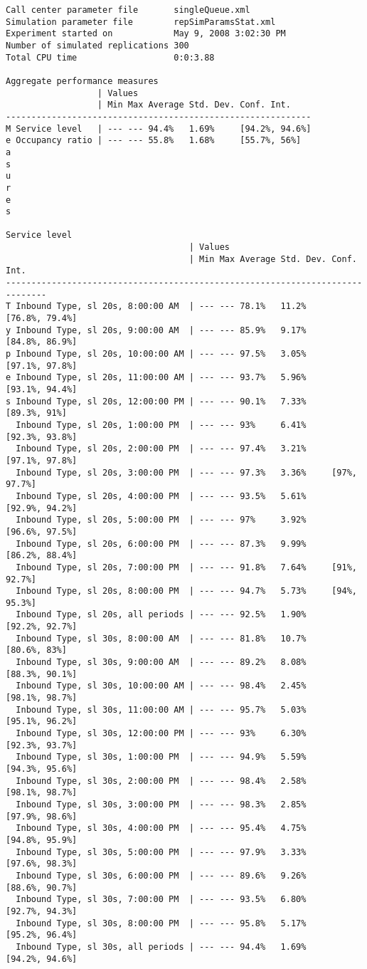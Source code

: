 \begin{lstlisting}[language={}, caption={Sample output of the
    simulator}, label=lst:exout]
Call center parameter file       singleQueue.xml
Simulation parameter file        repSimParamsStat.xml
Experiment started on            May 9, 2008 3:02:30 PM
Number of simulated replications 300
Total CPU time                   0:0:3.88

Aggregate performance measures
                  | Values
                  | Min Max Average Std. Dev. Conf. Int.
------------------------------------------------------------
M Service level   | --- --- 94.4%   1.69%     [94.2%, 94.6%]
e Occupancy ratio | --- --- 55.8%   1.68%     [55.7%, 56%]
a
s
u
r
e
s

Service level
                                    | Values
                                    | Min Max Average Std. Dev. Conf. Int.
------------------------------------------------------------------------------
T Inbound Type, sl 20s, 8:00:00 AM  | --- --- 78.1%   11.2%     [76.8%, 79.4%]
y Inbound Type, sl 20s, 9:00:00 AM  | --- --- 85.9%   9.17%     [84.8%, 86.9%]
p Inbound Type, sl 20s, 10:00:00 AM | --- --- 97.5%   3.05%     [97.1%, 97.8%]
e Inbound Type, sl 20s, 11:00:00 AM | --- --- 93.7%   5.96%     [93.1%, 94.4%]
s Inbound Type, sl 20s, 12:00:00 PM | --- --- 90.1%   7.33%     [89.3%, 91%]
  Inbound Type, sl 20s, 1:00:00 PM  | --- --- 93%     6.41%     [92.3%, 93.8%]
  Inbound Type, sl 20s, 2:00:00 PM  | --- --- 97.4%   3.21%     [97.1%, 97.8%]
  Inbound Type, sl 20s, 3:00:00 PM  | --- --- 97.3%   3.36%     [97%, 97.7%]
  Inbound Type, sl 20s, 4:00:00 PM  | --- --- 93.5%   5.61%     [92.9%, 94.2%]
  Inbound Type, sl 20s, 5:00:00 PM  | --- --- 97%     3.92%     [96.6%, 97.5%]
  Inbound Type, sl 20s, 6:00:00 PM  | --- --- 87.3%   9.99%     [86.2%, 88.4%]
  Inbound Type, sl 20s, 7:00:00 PM  | --- --- 91.8%   7.64%     [91%, 92.7%]
  Inbound Type, sl 20s, 8:00:00 PM  | --- --- 94.7%   5.73%     [94%, 95.3%]
  Inbound Type, sl 20s, all periods | --- --- 92.5%   1.90%     [92.2%, 92.7%]
  Inbound Type, sl 30s, 8:00:00 AM  | --- --- 81.8%   10.7%     [80.6%, 83%]
  Inbound Type, sl 30s, 9:00:00 AM  | --- --- 89.2%   8.08%     [88.3%, 90.1%]
  Inbound Type, sl 30s, 10:00:00 AM | --- --- 98.4%   2.45%     [98.1%, 98.7%]
  Inbound Type, sl 30s, 11:00:00 AM | --- --- 95.7%   5.03%     [95.1%, 96.2%]
  Inbound Type, sl 30s, 12:00:00 PM | --- --- 93%     6.30%     [92.3%, 93.7%]
  Inbound Type, sl 30s, 1:00:00 PM  | --- --- 94.9%   5.59%     [94.3%, 95.6%]
  Inbound Type, sl 30s, 2:00:00 PM  | --- --- 98.4%   2.58%     [98.1%, 98.7%]
  Inbound Type, sl 30s, 3:00:00 PM  | --- --- 98.3%   2.85%     [97.9%, 98.6%]
  Inbound Type, sl 30s, 4:00:00 PM  | --- --- 95.4%   4.75%     [94.8%, 95.9%]
  Inbound Type, sl 30s, 5:00:00 PM  | --- --- 97.9%   3.33%     [97.6%, 98.3%]
  Inbound Type, sl 30s, 6:00:00 PM  | --- --- 89.6%   9.26%     [88.6%, 90.7%]
  Inbound Type, sl 30s, 7:00:00 PM  | --- --- 93.5%   6.80%     [92.7%, 94.3%]
  Inbound Type, sl 30s, 8:00:00 PM  | --- --- 95.8%   5.17%     [95.2%, 96.4%]
  Inbound Type, sl 30s, all periods | --- --- 94.4%   1.69%     [94.2%, 94.6%]
\end{lstlisting}

